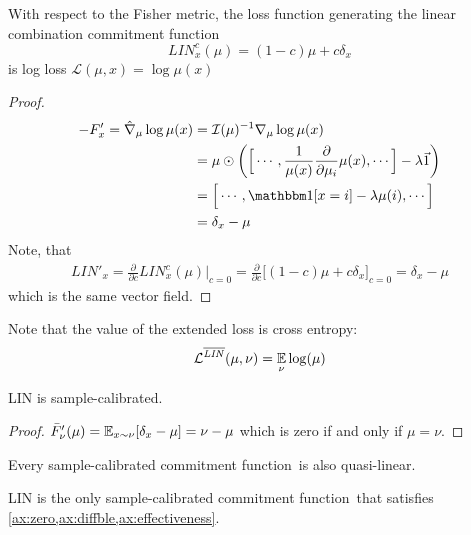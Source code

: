 \documentclass{article}
\def\cofunc{commitment function}
\begin{document}
\begin{prop}
    With respect to the Fisher metric, the loss function generating the linear combination \cofunc\ 
    \[
        \mathit{LIN}^c_{x}(\mu) = (1-c) \mu + c \delta_x
    \]
    is log loss
    $
        \mathcal L(\mu, x) = \log \mu(x) 
    $
\end{prop}
\begin{proof}
    \begin{align*}
    - F'_x = \hat \nabla_{\mu} \log \mu(x) &=  
        \mathcal I(\mu)^{-1} \nabla_\mu \log \mu(x) \\
        &= \mu \odot \left(\Big[ \cdots, \frac1{\mu(x)}\frac{\partial}{\partial \mu_i} \mu(x), \cdots \Big] - \lambda \vec 1 \right) \\
        &= \Big[\cdots, \mathbbm1[x=i] - \lambda \mu(i) ,\cdots\Big] \\
        &= \delta_x - \mu            
    \end{align*}
    Note, that
    \begin{align*}
        \mathit{LIN}'_x = \frac{\partial}{\partial c} \mathit{LIN}^c_x(\mu) \Big|_{c=0} 
            = \frac{\partial}{\partial c} \Big[ (1-c) \mu + c \delta_x \Big]_{c=0} = \delta_x - \mu
    \end{align*}
    which is the same vector field.  
\end{proof}

Note that the value of the extended loss is cross entropy:
\begin{align*}
    \mathcal L^{\overline{\mathit{LIN}}}(\mu, \nu) = \operatorname*{\mathbb{E}}_{\nu} \log(\mu)
\end{align*}

\begin{prop}
    LIN is sample-calibrated.
\end{prop}
\begin{proof}
    $ \bar F'_\nu(\mu) = \operatorname*{\mathbb{E}}_{x \sim \nu}[ \delta_x - \mu ] = \nu - \mu$ 
    which is zero if and only if $\mu = \nu$.
\end{proof}


\begin{conj}
    Every sample-calibrated \cofunc\  is also quasi-linear. 
\end{conj}
\begin{conj}
    LIN is the only sample-calibrated \cofunc\ that satisfies
    \cref{ax:zero,ax:diffble,ax:effectiveness}.
\end{conj}
\end{document}

